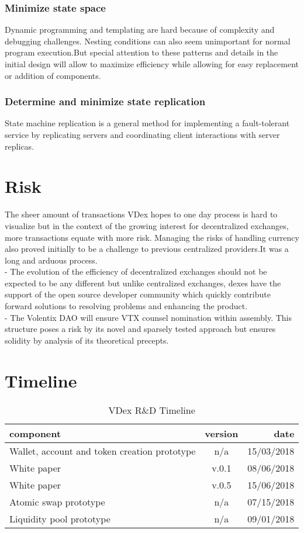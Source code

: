 \documentclass[]{article}
\begin{document}
	\subsubsection{Minimize state space}
	Dynamic programming and templating are hard because of complexity and debugging challenges. Nesting conditions can also seem unimportant for normal program execution.But special attention to these patterns and details in the initial design will allow to maximize efficiency while allowing for easy replacement or addition of components.   
	\subsubsection{Determine and minimize state replication}
	State machine replication is a general method for implementing a fault-tolerant service by replicating servers and coordinating client interactions with server replicas. 

\section{Risk}
	The sheer amount of transactions VDex hopes to one day process is 
	hard to visualize but in the context of the growing interest for decentralized exchanges, more transactions equate with more risk. 
	Managing the risks of handling currency also proved initially to be a challenge to previous centralized providers.It was a long and arduous process.\\
	- The evolution of the efficiency of decentralized exchanges should not be expected to be any different but unlike centralized exchanges, dexes have the support of the open source developer community which quickly contribute forward solutions to resolving problems and enhancing the product. \\
	- The Volentix DAO will ensure VTX counsel nomination within assembly. This structure poses a risk by its novel and sparsely tested approach but ensures solidity by analysis of its theoretical precepts.   
	
\section{Timeline}	
\begin{table}[h!]
	\begin{center}
		\caption{VDex R\&D Timeline}
		\label{tab:table1}
		\begin{tabular}{l|c|r}
			\textbf{component} & \textbf{version}&  \textbf{date}  \\
			\hline
			Wallet, account and token creation prototype  & n/a & 15/03/2018\\
			\hline			
			White paper  & v.0.1 & 08/06/2018\\
			\hline
			White paper  & v.0.5 & 15/06/2018\\
			\hline
			Atomic swap prototype  & n/a & 07/15/2018\\
			\hline
			Liquidity pool prototype  & n/a & 09/01/2018\\
			\hline
			
		\end{tabular}
	\end{center}
\end{table}
		
\end{document}
